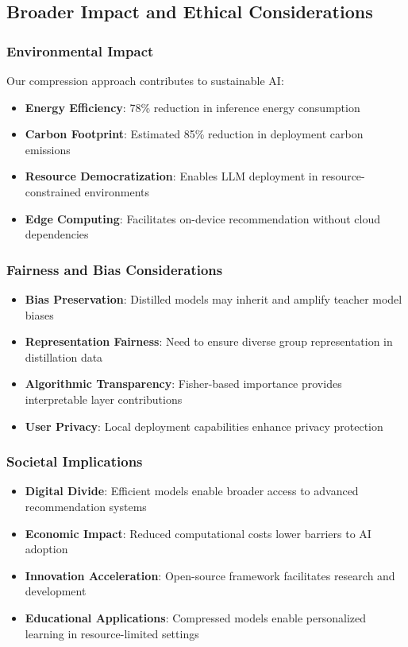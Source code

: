 \documentclass[10pt,conference]{IEEEtran}
\begin{document}
\subsection{Broader Impact and Ethical Considerations}

\subsubsection{Environmental Impact}

Our compression approach contributes to sustainable AI:

\begin{itemize}[leftmargin=*]
    \item \textbf{Energy Efficiency}: 78\% reduction in inference energy consumption
    \item \textbf{Carbon Footprint}: Estimated 85\% reduction in deployment carbon emissions
    \item \textbf{Resource Democratization}: Enables LLM deployment in resource-constrained environments
    \item \textbf{Edge Computing}: Facilitates on-device recommendation without cloud dependencies
\end{itemize}

\subsubsection{Fairness and Bias Considerations}

\begin{itemize}[leftmargin=*]
    \item \textbf{Bias Preservation}: Distilled models may inherit and amplify teacher model biases
    \item \textbf{Representation Fairness}: Need to ensure diverse group representation in distillation data
    \item \textbf{Algorithmic Transparency}: Fisher-based importance provides interpretable layer contributions
    \item \textbf{User Privacy}: Local deployment capabilities enhance privacy protection
\end{itemize}

\subsubsection{Societal Implications}

\begin{itemize}[leftmargin=*]
    \item \textbf{Digital Divide}: Efficient models enable broader access to advanced recommendation systems
    \item \textbf{Economic Impact}: Reduced computational costs lower barriers to AI adoption
    \item \textbf{Innovation Acceleration}: Open-source framework facilitates research and development
    \item \textbf{Educational Applications}: Compressed models enable personalized learning in resource-limited settings
\end{itemize}
\end{document}
